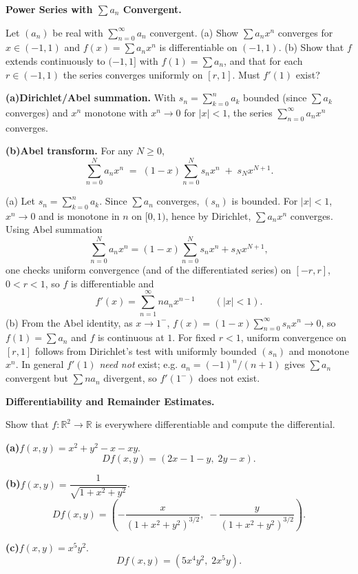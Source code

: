 \begin{problem}[CP-II-0317]
\label{prob:cp-ii-0317}
\textbf{Power Series with $\sum a_n$ Convergent.}

\hspace*{1.5em}Let $(a_n)$ be real with $\sum_{n=0}^\infty a_n$ convergent.
(a) Show $\sum a_n x^n$ converges for $x\in(-1,1)$ and $f(x)=\sum a_n x^n$ is differentiable on $(-1,1)$.
(b) Show that $f$ extends continuously to $(-1,1]$ with $f(1)=\sum a_n$, and that for each $r\in(-1,1)$ the series
converges uniformly on $[r,1]$. Must $f'(1)$ exist?

	\par\smallskip\noindent\textbf{(a)}\quad \textbf{Dirichlet/Abel summation.}
	With \(s_n=\sum_{k=0}^n a_k\) bounded (since \(\sum a_k\) converges) and \(x^n\) monotone with \(x^n\to0\) for \(|x|<1\),
	the series \(\displaystyle \sum_{n=0}^\infty a_n x^n\) converges.

	\par\smallskip\noindent\textbf{(b)}\quad \textbf{Abel transform.} For any \(N\ge0\),
	\[
	\sum_{n=0}^{N} a_n x^n
	\;=\;
	(1-x)\sum_{n=0}^{N} s_n x^n \;+\; s_N x^{N+1}.
	\]
\end{problem}

\begin{solution}
(a) Let $s_n=\sum_{k=0}^n a_k$. Since $\sum a_n$ converges, $(s_n)$ is bounded. For $|x|<1$, $x^n\to0$ and is monotone in $n$ on $[0,1)$, hence by Dirichlet,
$\sum a_n x^n$ converges. Using Abel summation
\[
\sum_{n=0}^N a_n x^n=(1-x)\sum_{n=0}^N s_n x^n+s_N x^{N+1},
\]
one checks uniform convergence (and of the differentiated series) on $[-r,r]$, $0<r<1$, so $f$ is differentiable and
\[
f'(x)=\sum_{n=1}^\infty n a_n x^{n-1}\qquad (|x|<1).
\]
(b) From the Abel identity, as $x\to1^-$,
\(
f(x)=(1-x)\sum_{n=0}^\infty s_n x^n \to 0
\),
so $f(1)=\sum a_n$ and $f$ is continuous at $1$. For fixed $r<1$, uniform convergence on $[r,1]$ follows from Dirichlet's test with uniformly bounded $(s_n)$ and monotone $x^n$.
In general $f'(1)$ \emph{need not} exist; e.g. $a_n=(-1)^n/(n+1)$ gives $\sum a_n$ convergent but $\sum n a_n$ divergent, so $f'(1^-)$ does not exist.

\bigskip
\end{solution}

\begin{problem}[CP-II-0325]
\label{prob:cp-ii-0325}
\textbf{Differentiability and Remainder Estimates.}

\hspace*{1.5em}Show that $f:\mathbb{R}^2\to\mathbb{R}$ is everywhere differentiable and compute the differential.

	\par\smallskip\noindent\textbf{(a)}\quad $f(x,y)=x^2+y^2-x-xy$.
	\[
	Df(x,y)=(2x-1-y,\;2y-x).
	\]

	\par\smallskip\noindent\textbf{(b)}\quad $f(x,y)=\dfrac{1}{\sqrt{1+x^2+y^2}}$.
	\[
	Df(x,y)=\left(-\frac{x}{(1+x^2+y^2)^{3/2}},\; -\frac{y}{(1+x^2+y^2)^{3/2}}\right).
	\]

	\par\smallskip\noindent\textbf{(c)}\quad $f(x,y)=x^5y^2$.
	\[
	Df(x,y)=(5x^4y^2,\;2x^5y).
	\]
\end{problem}

